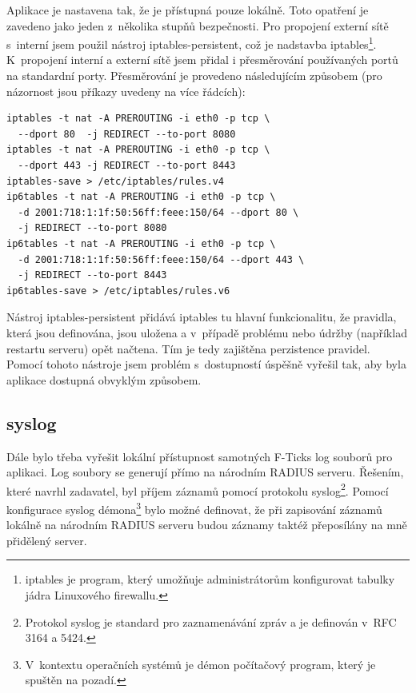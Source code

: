\documentclass[thesis=M,czech]{FITthesis}[2012/06/26]
\begin{document}
      Aplikace je nastavena tak, že je přístupná pouze lokálně.
      Toto opatření je zavedeno jako jeden z~několika stupňů bezpečnosti.
      Pro propojení externí sítě s~interní jsem použil nástroj iptables-persistent,
      což je nadstavba iptables\footnote{
        iptables je program, který umožňuje administrátorům konfigurovat tabulky jádra Linuxového firewallu.        
      }.
      K~propojení interní a externí sítě jsem přidal i přesměrování používaných portů na standardní porty.
      Přesměrování je provedeno následujícím způsobem (pro názornost jsou příkazy uvedeny na více řádcích):

      \begin{verbatim}
iptables -t nat -A PREROUTING -i eth0 -p tcp \
  --dport 80  -j REDIRECT --to-port 8080
iptables -t nat -A PREROUTING -i eth0 -p tcp \
  --dport 443 -j REDIRECT --to-port 8443
iptables-save > /etc/iptables/rules.v4
ip6tables -t nat -A PREROUTING -i eth0 -p tcp \
  -d 2001:718:1:1f:50:56ff:feee:150/64 --dport 80 \
  -j REDIRECT --to-port 8080
ip6tables -t nat -A PREROUTING -i eth0 -p tcp \
  -d 2001:718:1:1f:50:56ff:feee:150/64 --dport 443 \
  -j REDIRECT --to-port 8443
ip6tables-save > /etc/iptables/rules.v6
      \end{verbatim}

      Nástroj iptables-persistent přidává iptables tu hlavní funkcionalitu, že pravidla,
      která jsou definována, jsou uložena a v~případě problému nebo údržby (například restartu serveru) opět načtena.
      Tím je tedy zajištěna perzistence pravidel.
      Pomocí tohoto nástroje jsem problém s~dostupností úspěšně vyřešil tak, aby byla aplikace dostupná obvyklým způsobem.
 
    \subsection{syslog}
    
      Dále bylo třeba vyřešit lokální přístupnost samotných F-Ticks log souborů pro aplikaci.
      Log soubory se generují přímo na národním RADIUS serveru.
      Řešením, které navrhl zadavatel, byl příjem záznamů pomocí protokolu syslog\footnote{
        Protokol syslog je standard pro zaznamenávání zpráv a je definován v~RFC 3164 a 5424.
      }.
      Pomocí konfigurace syslog démona\footnote{
        V~kontextu operačních systémů je démon počítačový program, který je spuštěn na pozadí.  
      }
      bylo možné definovat, že při zapisování záznamů
      lokálně na národním RADIUS serveru budou záznamy taktéž přeposílány
      na mně přidělený server.
\end{document}
